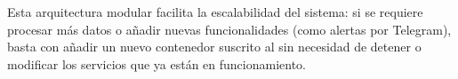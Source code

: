 Esta arquitectura modular facilita la escalabilidad del sistema: si se requiere procesar más datos o añadir nuevas funcionalidades (como alertas por Telegram), basta con añadir un nuevo contenedor suscrito al  sin necesidad de detener o modificar los servicios que ya están en funcionamiento.